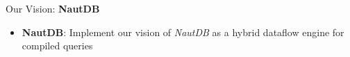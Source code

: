 \begin{block}{Our Vision: \textbf{NautDB}}
  \begin{itemize}
  \item \textbf{NautDB}: Implement our vision of \textit{NautDB} as a
    hybrid dataflow engine for compiled queries
  \end{itemize}
\end{block}



